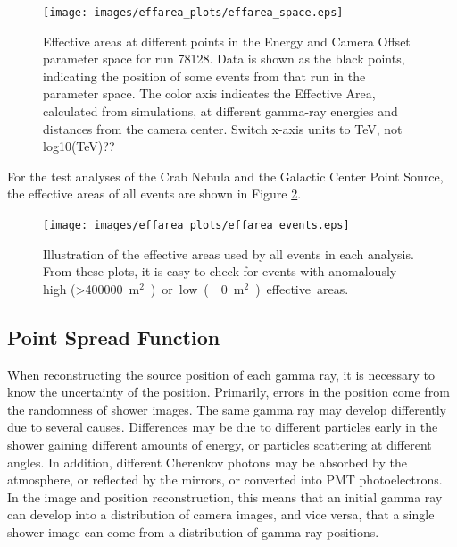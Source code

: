     \begin{figure}[ht]
      \centering
      \texttt{[image: images/effarea\_plots/effarea\_space.eps]}
      \caption[Effective Area Parameter Space]{
        Effective areas at different points in the Energy and Camera Offset parameter space for run 78128.
        Data is shown as the black points, indicating the position of some events from that run in the parameter space.
        The color axis indicates the Effective Area, calculated from simulations, at different gamma-ray energies and distances from the camera center.
        {\color{red}Switch x-axis units to TeV, not log10(TeV)??}
      }
      \label{fig:effarea_paramspace}
    \end{figure}

    For the test analyses of the Crab Nebula and the Galactic Center Point Source, the effective areas of all events are shown in Figure \ref{fig:effarea_usage}.

    \begin{figure}[ht]
      \centering
      \texttt{[image: images/effarea\_plots/effarea\_events.eps]}
      \caption[Effective Areas Used]{
      Illustration of the effective areas used by all events in each analysis.
      From these plots, it is easy to check for events with anomalously high (>\SI{400000}{m${}^2$}) or low (\nicetilde\SI{0}{m${}^2$}) effective areas.
      }
      \label{fig:effarea_usage}
    \end{figure}
  
  \FloatBarrier

  \subsection{Point Spread Function}\label{subsec:psf}

    When reconstructing the source position of each gamma ray, it is necessary to know the uncertainty of the position.
    Primarily, errors in the position come from the randomness of shower images.
    The same gamma ray may develop differently due to several causes.
    Differences may be due to different particles early in the shower gaining different amounts of energy, or particles scattering at different angles.
    In addition, different Cherenkov photons may be absorbed by the atmosphere, or reflected by the mirrors, or converted into PMT photoelectrons.
    In the image and position reconstruction, this means that an initial gamma ray can develop into a distribution of camera images, and vice versa, that a single shower image can come from a distribution of gamma ray positions.

